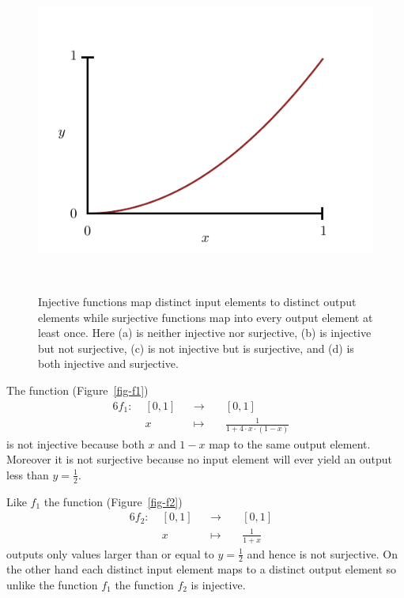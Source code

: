 \documentclass[
  letterpaper,
  DIV=11,
  numbers=noendperiod]{scrartcl}
\begin{document}
\begin{figure}
\begin{minipage}[t]{0.45\linewidth}
{{\includegraphics{figures/maps/graphs/f4/f4.pdf}

}

}

\subcaption{\label{fig-f4}}
\end{minipage}%
%
\begin{minipage}[t]{0.05\linewidth}

{\centering 

~

}

\end{minipage}%

\caption{\label{fig-function-examples}Injective functions map distinct
input elements to distinct output elements while surjective functions
map into every output element at least once. Here (a) is neither
injective nor surjective, (b) is injective but not surjective, (c) is
not injective but is surjective, and (d) is both injective and
surjective.}

\end{figure}

The function (Figure~\ref{fig-f1}) \begin{alignat*}{6}
f_1 :\; & [0, 1] & &\rightarrow& \; & [0, 1] &
\\
& x & &\mapsto& & \frac{1}{1 + 4 \cdot x \cdot (1 - x)} &
\end{alignat*} is not injective because both \(x\) and \(1 - x\) map to
the same output element. Moreover it is not surjective because no input
element will ever yield an output less than \(y = \frac{1}{2}\).

Like \(f_1\) the function (Figure~\ref{fig-f2}) \begin{alignat*}{6}
f_2 :\; & [0, 1] & &\rightarrow& \; & [0, 1] &
\\
& x & &\mapsto& & \frac{1}{1 + x} &
\end{alignat*} outputs only values larger than or equal to
\(y = \frac{1}{2}\) and hence is not surjective. On the other hand each
distinct input element maps to a distinct output element so unlike the
function \(f_1\) the function \(f_2\) is injective.
\end{document}
